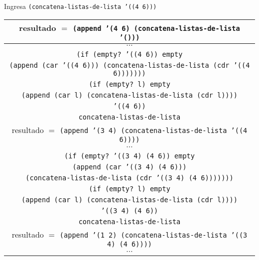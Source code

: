 \documentclass[letterpaper,11pt]{article}
\begin{document}
\begin{enumerate}
\begin{enumerate}
        \newpage
        Ingresa \texttt{(concatena-listas-de-lista '((4 6)))}
        \begin{center}
            \begin{tabular}{|c|}
                \hline
                resultado $=$ \texttt{(append '(4 6) 
                (concatena-listas-de-lista '()))}  \\
                \hline
                $\cdots$ \\
                \hline
                \texttt{(if (empty? '((4 6)) empty} \\
                \texttt{(append (car '((4 6))) 
                (concatena-listas-de-lista (cdr '((4 6)))))))} \\
                \hline
                \texttt{(if (empty? l) empty} \\
                \texttt{(append (car l) (concatena-listas-de-lista (cdr l))))} \\
                \hline
                \texttt{'((4 6))} \\
                \hline
                \texttt{concatena-listas-de-lista} \\
                \hline
                \hline
                resultado $=$ \texttt{(append '(3 4) 
                (concatena-listas-de-lista '((4 6))))}  \\
                \hline
                $\cdots$ \\
                \hline
                \texttt{(if (empty? '((3 4) (4 6)) empty} \\
                \texttt{(append (car '((3 4) (4 6)))} \\ 
                \texttt{(concatena-listas-de-lista (cdr '((3 4) (4 6)))))))} \\
                \hline
                \texttt{(if (empty? l) empty} \\
                \texttt{(append (car l) (concatena-listas-de-lista (cdr l))))} \\
                \hline
                \texttt{'((3 4) (4 6))} \\
                \hline
                \texttt{concatena-listas-de-lista} \\
                \hline
                \hline
                resultado $=$ \texttt{(append '(1 2) 
                (concatena-listas-de-lista '((3 4) (4 6))))}  \\
                \hline
                $\cdots$ \\
                \hline

\end{tabular}
\end{center}
\end{enumerate}
\end{enumerate}
\end{document}
